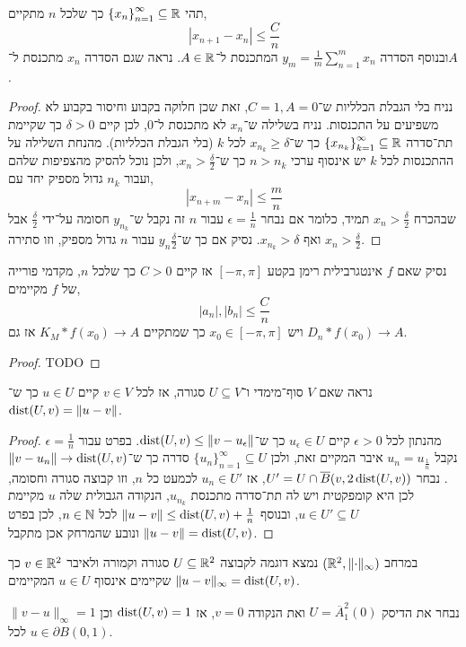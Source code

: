 \question{}
\subquestion{}
תהי ${\{ x_n \}}_{n = 1}^\infty \subseteq \mathbb{R}$ כך שלכל $n$ מתקיים,
\[
	|x_{n + 1} - x_n| \le \frac{C}{n}
\]
ובנוסף הסדרה $y_m = \frac{1}{m} \sum_{n = 1}^m x_n$ המתכנסת ל־$A \in \mathbb{R}$.
נראה שגם הסדרה $x_n$ מתכנסת ל־$A$.
\begin{proof}
	נניח בלי הגבלת הכלליות ש־$C = 1, A = 0$, זאת שכן חלוקה בקבוע וחיסור בקבוע לא משפיעים על התכנסות.
	נניח בשלילה ש־$x_n$ לא מתכנסת ל־$0$, לכן קיים $\delta > 0$ כך שקיימת תת־סדרה ${\{ x_{n_k} \}}_{k = 1}^\infty \subseteq \mathbb{R}$ כך ש־$x_{n_k} \ge \delta$ לכל $k$ (בלי הגבלת הכלליות).
	מהנחת השלילה על ההתכנסות לכל $k$ יש אינסוף ערכי $n > n_k$ כך ש־$x_n > \frac{\delta}{2}$, ולכן נוכל להסיק מהצפיפות שלהם ועבור $n_k$ גדול מספיק יחד עם,
	\[
		|x_{n + m} - x_n| \le \frac{m}{n}
	\]
	שבהכרח $x_n > \frac{\delta}{2}$ תמיד, כלומר אם נבחר $\epsilon = \frac{1}{n}$ עבור $n$ זה נקבל ש־$y_{n_k}$ חסומה על־ידי $\frac{\delta}{2}$ אבל $x_n > \frac{\delta}{2}$ ואף $x_{n_k} > \delta$.
	נסיק אם כך ש־$y_n \frac{\delta}{2}$ עבור $n$ גדול מספיק, וזו סתירה.
\end{proof}

\subquestion{}
נסיק שאם $f$ אינטגרבילית רימן בקטע $[-\pi, \pi]$ אז קיים $C > 0$ כך שלכל $n$,
מקדמי פורייה של $f$ מקיימים,
\[
	|a_n|, |b_n|
	\le \frac{C}{n}
\]
ויש $x_0 \in [-\pi, \pi]$ כך שמתקיים $K_M * f(x_0) \to A$ אז גם $D_n * f(x_0) \to A$.
\begin{proof}
	TODO
\end{proof}

\question{}
\subquestion{}
נראה שאם $V$ סוף־מימדי ו־$U \subseteq V$ סגורה,
אז לכל $v \in V$ קיים $u \in U$ כך ש־$\operatorname{dist}(U, v) = \lVert u - v \rVert$.
\begin{proof}
	מהנתון לכל $\epsilon > 0$ קיים $u_{\epsilon} \in U$ כך ש־$\operatorname{dist}(U, v) \le \lVert v - u_{\epsilon} \rVert$.
	בפרט עבור $\epsilon = \frac{1}{n}$ נקבל $u_n = u_{\frac{1}{n}}$ איבר המקיים זאת, ולכן ${\{ u_n \}}_{n = 1}^\infty \subseteq U$ סדרה כך ש־$\lVert v - u_n \rVert \to \operatorname{dist}(U, v)$.
	נבחר $U' = U \cap \overline{B}(v, 2 \operatorname{dist}(U, v))$, אז $u_n \in U'$ לכמעט כל $n$, וזו קבוצה סגורה וחסומה, לכן היא קומפקטית ויש לה תת־סדרה מתכנסת $u_{n_k}$, הנקודה הגבולית שלה $u$ מקיימת $u \in U' \subseteq U$,
	ובנוסף $\lVert u - v \rVert \le \operatorname{dist}(U, v) + \frac{1}{n}$ לכל $n \in \mathbb{N}$, לכן בפרט $\lVert u - v \rVert = \operatorname{dist}(U, v)$ ונובע שהמרחק אכן מתקבל.
\end{proof}

\subquestion{}
במרחב $(\mathbb{R}^2, \lVert \cdot \rVert_\infty)$ נמצא דוגמה לקבוצה $U \subseteq \mathbb{R}^2$ סגורה וקמורה ולאיבר $v \in \mathbb{R}^2$ כך שקיימים אינסוף $u \in U$ המקיימים $\lVert u - v \rVert_\infty = \operatorname{dist}(U, v)$.
\begin{solution}
	נבחר את הדיסק $U = \overline{A}_1^2(0)$ ואת הנקודה $v = 0$, אז $\operatorname{dist}(U, v) = 1$ וכן $\lVert v - u \rVert_\infty = 1$ לכל $u \in \partial B(0, 1)$.
\end{solution}


